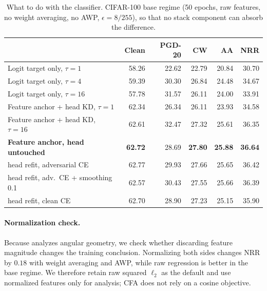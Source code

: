 \begin{table}[!htbp]
  \centering \small \setlength{\tabcolsep}{4.5pt}
  \caption{What to do with the classifier. CIFAR-100 base regime (50 epochs, raw features, no weight
  averaging, no AWP, $\epsilon=8/255$), so that no stack component can absorb the difference.}
  \label{tab:ablation}
  \begin{tabular}{lrrrrr}
    \toprule
    & Clean & PGD-20 & CW & AA & NRR \\
    \midrule
    Logit target only, $\tau=1$               & 58.26 & 22.62 & 22.79 & 20.84 & 30.70 \\
    Logit target only, $\tau=4$               & 59.39 & 30.30 & 26.84 & 24.48 & 34.67 \\
    Logit target only, $\tau=16$              & 57.78 & 31.57 & 26.11 & 24.00 & 33.91 \\
    Feature anchor + head KD, $\tau=1$        & 62.34 & 26.34 & 26.11 & 23.93 & 34.58 \\
    Feature anchor + head KD, $\tau=16$       & 62.61 & 32.47 & 27.32 & 25.61 & 36.35 \\
    \textbf{Feature anchor, head untouched}   & \textbf{62.72} & 28.69 & \textbf{27.80} & \textbf{25.88} & \textbf{36.64} \\
    \quad head refit, adversarial CE          & 62.77 & 29.93 & 27.66 & 25.65 & 36.42 \\
    \quad head refit, adv.\ CE + smoothing 0.1& 62.57 & 30.43 & 27.55 & 25.66 & 36.39 \\
    \quad head refit, clean CE                & 62.70 & 28.90 & 27.23 & 25.15 & 35.90 \\
    \bottomrule
  \end{tabular}
\end{table}

\paragraph{Normalization check.} Because  analyzes angular geometry, we
check whether discarding feature magnitude changes the training conclusion. Normalizing both sides
changes NRR by $0.18$ with weight averaging and AWP, while raw regression is better in the base
regime. We therefore retain raw squared $\ell_2$ as the default and use normalized features only for
analysis; CFA does not rely on a cosine objective.

